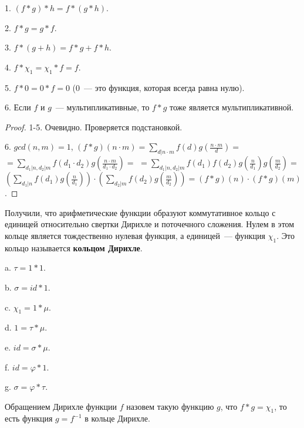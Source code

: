 \begin{properties}

    1. $(f * g) * h = f * (g * h)$.

    2. $f * g = g * f$.

    3. $f * (g + h) = f * g + f * h$.

    4. $f * \chi_1 = \chi_1 * f = f$.

    5. $f * 0 = 0 * f = 0$ ($0$~--- это функция, которая всегда равна нулю).

    6. Если $f$ и $g$~--- мультипликативные, то $f * g$ тоже является мультипликативной.
\end{properties}

\begin{proof}
    1-5. Очевидно. Проверяется подстановкой.

    6. $gcd(n, m)=1$, $(f*g)(n \cdot m) =  \sum \limits_{d|n \cdot m} f(d)g(\frac{n \cdot m}{d}) = $
    $= \sum \limits_{d_1|n, d_2|m} f(d_1 \cdot d_2) g(\frac{n \cdot m}{d_1 \cdot d_2}) =$
    $=\sum \limits_{d_1|n, d_2|m} f(d_1) f(d_2) g(\frac{n}{d_1}) g(\frac{m}{d_2}) = $
    $\left(\sum \limits_{d_1|n} f(d_1) g(\frac{n}{d_1})\right) \cdot \left(\sum \limits_{d_2|m} f(d_2) g(\frac{m}{d_2})\right) = (f * g)(n) \cdot (f * g)(m)$.
\end{proof}

Получили, что арифметические функции образуют коммутативное кольцо с единицей относительно свертки Дирихле и поточечного сложения.
Нулем в этом кольце является тождественно нулевая функция, а единицей~--- функция $\chi_1$. Это кольцо называется \textbf{кольцом Дирихле}.

\begin{example}
\label{Mobius: 1mu}
    a. $\tau = 1 * 1$.

    b. $\sigma = id * 1$.

    c. $\chi_1 = 1 * \mu$.

    d. $1 = \tau * \mu$.

    e. $id = \sigma * \mu$.

    f. $id = \varphi * 1$.

    g. $\sigma = \varphi * \tau$.

\end{example}


\begin{definition}
    Обращением Дирихле функции $f$ назовем такую функцию $g$, что
    $f * g = \chi_1$, то есть функция $g = f^{-1}$ в кольце Дирихле.
\end{definition}

